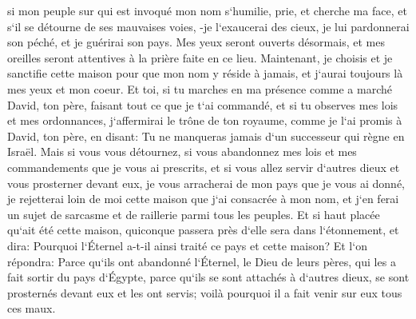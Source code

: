 \verse si mon peuple sur qui est invoqué mon nom s`humilie, prie, et cherche ma face, et s`il se détourne de ses mauvaises voies, -je l`exaucerai des cieux, je lui pardonnerai son péché, et je guérirai son pays. 
\verse Mes yeux seront ouverts désormais, et mes oreilles seront attentives à la prière faite en ce lieu. 
\verse Maintenant, je choisis et je sanctifie cette maison pour que mon nom y réside à jamais, et j`aurai toujours là mes yeux et mon coeur. 
\verse Et toi, si tu marches en ma présence comme a marché David, ton père, faisant tout ce que je t`ai commandé, et si tu observes mes lois et mes ordonnances, 
\verse j`affermirai le trône de ton royaume, comme je l`ai promis à David, ton père, en disant: Tu ne manqueras jamais d`un successeur qui règne en Israël. 
\verse Mais si vous vous détournez, si vous abandonnez mes lois et mes commandements que je vous ai prescrits, et si vous allez servir d`autres dieux et vous prosterner devant eux, 
\verse je vous arracherai de mon pays que je vous ai donné, je rejetterai loin de moi cette maison que j`ai consacrée à mon nom, et j`en ferai un sujet de sarcasme et de raillerie parmi tous les peuples. 
\verse Et si haut placée qu`ait été cette maison, quiconque passera près d`elle sera dans l`étonnement, et dira: Pourquoi l`Éternel a-t-il ainsi traité ce pays et cette maison? 
\verse Et l`on répondra: Parce qu`ils ont abandonné l`Éternel, le Dieu de leurs pères, qui les a fait sortir du pays d`Égypte, parce qu`ils se sont attachés à d`autres dieux, se sont prosternés devant eux et les ont servis; voilà pourquoi il a fait venir sur eux tous ces maux. 

